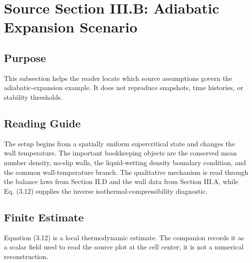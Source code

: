 \section{Source Section III.B: Adiabatic Expansion Scenario}
\label{sec:adiabatic-expansion}


\subsection*{Purpose}

This subsection helps the reader locate which source assumptions govern the
adiabatic-expansion example.  It does not reproduce snapshots, time histories,
or stability thresholds.

\subsection*{Reading Guide}

The setup begins from a spatially uniform supercritical state and changes the
wall temperature.  The important bookkeeping objects are the conserved mean
number density, no-slip walls, the liquid-wetting density boundary condition,
and the common wall-temperature branch.  The qualitative mechanism is read
through the balance laws from Section II.D and the wall data from Section III.A,
while Eq. (3.12) supplies the inverse isothermal-compressibility diagnostic.

\subsection*{Finite Estimate}

Equation (3.12) is a local thermodynamic estimate.  The companion records it as
a scalar field used to read the source plot at the cell center; it is not a
numerical reconstruction.

